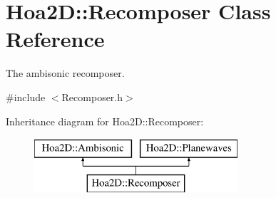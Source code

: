 \hypertarget{class_hoa2_d_1_1_recomposer}{\section{Hoa2\-D\-:\-:Recomposer Class Reference}
\label{class_hoa2_d_1_1_recomposer}
}


The ambisonic recomposer.  




{\ttfamily \#include $<$Recomposer.\-h$>$}

Inheritance diagram for Hoa2\-D\-:\-:Recomposer\-:\begin{figure}[H]
\begin{center}
\leavevmode
\includegraphics[height=2.000000cm]{class_hoa2_d_1_1_recomposer}
\end{center}
\end{figure}
